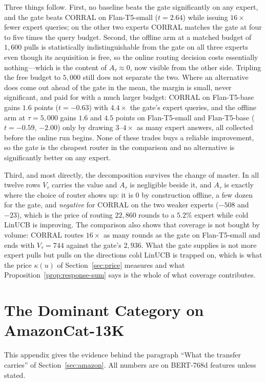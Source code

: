 \documentclass{article}
\theoremstyle{definition}
\theoremstyle{remark}
\theoremstyle{remark}
\begin{document}
Three things follow. First, no baseline beats the gate significantly on any
expert, and the gate beats CORRAL on Flan-T5-small ($t=2.64$) while issuing
$16\times$ fewer expert queries; on the other two experts CORRAL matches the
gate at four to five times the query budget. Second, the offline arm at a
matched budget of $1{,}600$ pulls is statistically indistinguishable from the
gate on all three experts even though its acquisition is free, so the online
routing decision costs essentially nothing---which is the content of
$A_\tau\approx0$, now visible from the other side. Tripling the free budget to
$5{,}000$ still does not separate the two. Where an alternative does come out
ahead of the gate in the mean, the margin is small, never significant, and
paid for with a much larger budget: CORRAL on Flan-T5-base gains $1.6$
points ($t=-0.63$) with $4.4\times$ the gate's expert queries, and the
offline arm at $\tau=5{,}000$ gains $1.6$ and $4.5$ points on Flan-T5-small
and Flan-T5-base ($t=-0.59$, $-2.00$) only by drawing $3$--$4\times$ as many
expert answers, all collected before the online run begins. None of these
trades buys a reliable improvement, so the gate is the cheapest router in
the comparison and no alternative is significantly better on any expert.

Third, and most directly, the decomposition survives the change of master. In
all twelve rows $V_\tau$ carries the value and $A_\tau$ is negligible beside
it, and $A_\tau$ is exactly where the choice of router shows up: it is $0$ by
construction offline, a few dozen for the gate, and \emph{negative} for CORRAL
on the two weaker experts ($-508$ and $-23$), which is the price of routing
$22{,}860$ rounds to a $5.2\%$ expert while cold LinUCB is improving. The
comparison also shows that coverage is not bought by volume: CORRAL routes
$16\times$ as many rounds as the gate on Flan-T5-small and ends with
$V_\tau=744$ against the gate's $2{,}936$. What the gate supplies is not more
expert pulls but pulls on the directions cold LinUCB is trapped on, which is
what the price $\kappa(u)$ of Section~\ref{sec:price} measures and what
Proposition~\ref{prop:response-sum} says is the whole of what coverage contributes.

\section{The Dominant Category on AmazonCat-13K}
\label{app:dominant}

This appendix gives the evidence behind the paragraph ``What the transfer
carries'' of Section~\ref{sec:amazon}. All numbers are on BERT-768d features
unless stated.
\end{document}
